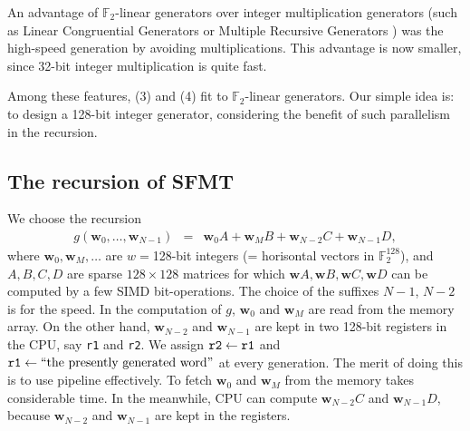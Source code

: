 \documentclass[acmnow]{acmtrans2m}
\def\F2{{\mathbb F}_2}
\def\bw{{{\mathbf w}}}
\begin{document}
An advantage of $\F2$-linear generators 
over integer multiplication generators 
(such as Linear Congruential Generators or Multiple
Recursive Generators \cite{MRG})
was the high-speed generation by avoiding multiplications.
This advantage is now smaller, since 
32-bit integer multiplication is quite fast. 

Among these features,
(3) and (4) fit to $\F2$-linear generators. 
Our simple idea is: to design
a 128-bit integer generator, considering
the benefit of such parallelism in the recursion.

\subsection{The recursion of SFMT}
We choose the recursion
\begin{eqnarray}\label{eq:rec-SFMT}
g(\bw_0,\ldots,\bw_{N-1}) 
&=& \bw_0A + \bw_MB + \bw_{N-2}C + \bw_{N-1}D,
\end{eqnarray}
where 
$\bw_0, \bw_M, \ldots$ are $w=$128-bit integers 
(= horisontal vectors in $\F2^{128}$),
and $A, B, C, D$ are sparse $128 \times 128$ matrices
for which 
$\bw A, \bw B, \bw C, \bw D$ can be computed by
a few SIMD bit-operations.
The choice of the suffixes $N-1$, $N-2$ is for the 
speed. In the computation of $g$, 
$\bw_0$ and $\bw_M$ are read from the memory array.
On the other hand, 
$\bw_{N-2}$ and $\bw_{N-1}$ are kept in two 128-bit
registers in the CPU, 
say {\tt r1} and {\tt r2}. We assign 
${\tt r2} \leftarrow {\tt r1}$ and
${\tt r1} \leftarrow \mbox{``the presently generated word''}$
at every generation.
The merit of doing this is to use pipeline effectively. To fetch 
$\bw_0$ and $\bw_M$ from the memory takes considerable
time. In the meanwhile, 
CPU can compute $\bw_{N-2}C$ and $\bw_{N-1}D$,
because $\bw_{N-2}$ and $\bw_{N-1}$ are kept 
in the registers.
\end{document}
